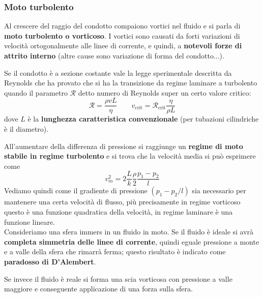 \documentclass[x11names]{article}
\begin{document}
		\subsubsection{Moto turbolento}
		Al crescere del raggio del condotto compaiono vortici nel fluido e si parla di \textbf{moto turbolento o vorticoso}. I vortici sono causati da forti variazioni di velocità ortogonalmente alle linee di corrente, e quindi, a \textbf{notevoli forze di attrito interno} (altre cause sono variazione di forma del condotto...).
		
		Se il condotto è a sezione costante vale la legge sperimentale descritta da Reynolds che ha provato che si ha la transizione da regime laminare a turbolento quando il parametro \(\mathcal{R}\) detto numero di Reynolds super un certo valore critico:
		\[ 
		\mathcal{R} = \frac{\rho v L}{\eta} \qquad  v_{\text{crit}} = \mathcal{R}_{\text{crit}}\frac{\eta}{\rho L}
		\]
		dove \(L\) è la \textbf{lunghezza caratteristica convenzionale} (per tubazioni cilindriche è il diametro).
		
		All'aumentare della differenza di pressione si raggiunge un \textbf{regime di moto stabile in regime turbolento} e si trova che la velocità media si può esprimere come
		\[ 
		v_{m}^2 = 2\frac{L}{k}\frac{\rho }{2} \frac{p_{1} - p_{2}}{l} 
		\]
		Vediamo quindi come il gradiente di pressione \((p_{1}-p_{2}/l)\) sia necessario per mantenere una certa velocità di flusso, più precisamente in regime vorticoso questo è una funzione quadratica della velocità, in regime laminare è una funzione lineare. \\
		
		\noindent
		Consideriamo una sfera immers in un fluido in moto. Se il fluido è ideale si avrà \textbf{completa simmetria delle linee di corrente}, quindi eguale pressione a monte e a valle della sfera che rimarrà ferma; questo risultato è indicato come \textbf{paradosso di D'Alembert}. 
		
		Se invece il fluido è reale si forma una scia vorticosa con pressione a valle maggiore e conseguente applicazione di una forza sulla sfera.
		
\end{document}
